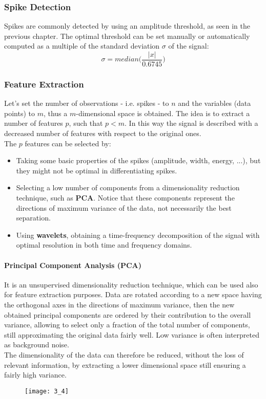\subsubsection{Spike Detection}
Spikes are commonly detected by using an amplitude threshold, as seen in the previous
chapter. The optimal threshold can be set manually or automatically computed as a
multiple of the standard deviation \(\sigma\) of the signal:
\begin{equation*}
    \sigma=median\biggl(\frac{|x|}{0.6745}\biggr)
\end{equation*}
\subsubsection{Feature Extraction}
Let's set the number of observations - i.e. spikes - to \(n\) and the variables
(data points) to \(m\), thus a \(m\)-dimensional space is obtained. The idea is to
extract a number of features \(p\), such that \(p<m\). In this way the signal is
described with a decreased number of features with respect to the original ones.\\
The \(p\) features can be selected by:
\begin{itemize}
    \item Taking some basic properties of the spikes (amplitude, width, energy, ...),
          but they might not be optimal in differentiating spikes.
    \item Selecting a low number of components from a dimensionality reduction
          technique, such as \textbf{PCA}. Notice that these components represent the
          directions of maximum variance of the data, not necessarily the best separation.
    \item Using \textbf{wavelets}, obtaining a time-frequency decomposition of the
          signal with optimal resolution in both time and frequency domains.
\end{itemize}
\paragraph{Principal Component Analysis (PCA)}
It is an unsupervised dimensionality reduction technique, which can be used also for
feature extraction purposes. Data are rotated according to a new space having the
orthogonal axes in the directions of maximum variance, then the new obtained principal
components are ordered by their contribution to the overall variance, allowing to
select only a fraction of the total number of components, still approximating the
original data fairly well. Low variance is often interpreted as background noise.\\
The dimensionality of the data can therefore be reduced, without the loss of relevant
information, by extracting a lower dimensional space still ensuring a fairly high variance.
\begin{figure}[H]
    \texttt{[image: 3\_4]}
    \centering
\end{figure}
